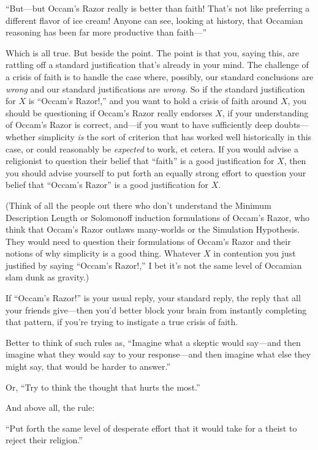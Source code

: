 {
 ``But---but Occam's Razor really
is better than faith! That's not like preferring a
different flavor of ice cream! Anyone can see, looking at history, that
Occamian reasoning has been far more productive than
faith---''}

{
 Which is all true. But beside the point. The point is that you,
saying this, are rattling off a standard justification
that's already in your mind. The challenge of a crisis
of faith is to handle the case where, possibly, our standard
conclusions are \textit{wrong} and our standard justifications are
\textit{wrong.} So if the standard justification for $X$ is
``Occam's Razor!,''
and you want to hold a crisis of faith around $X$, you should be
questioning if Occam's Razor really endorses $X$, if your
understanding of Occam's Razor is correct, and---if you
want to have sufficiently deep doubts---whether simplicity \textit{is}
the sort of criterion that has worked well historically in this case,
or could reasonably be \textit{expected} to work, et cetera. If you
would advise a religionist to question their belief that
``faith'' is a good justification
for $X$, then you should advise yourself to put forth an equally strong
effort to question your belief that
``Occam's Razor'' is
a good justification for $X$.}

{
 (Think of all the people out there who don't
understand the Minimum Description Length or Solomonoff induction
formulations of Occam's Razor, who think that
Occam's Razor outlaws many-worlds or the Simulation
Hypothesis. They would need to question their formulations of
Occam's Razor and their notions of why simplicity is a
good thing. Whatever $X$ in contention you just justified by saying
``Occam's Razor!,''
I bet it's not the same level of Occamian slam dunk as
gravity.)}

{
 If ``Occam's
Razor!'' is your usual reply, your standard reply,
the reply that all your friends give---then you'd
better block your brain from instantly completing that pattern, if
you're trying to instigate a true crisis of faith.}

{
 Better to think of such rules as, ``Imagine what
a skeptic would say---and then imagine what they would say to your
response---and then imagine what else they might say, that would be
harder to answer.''}

{
 Or, ``Try to think the thought that hurts the
most.''}

{
 And above all, the rule:}

{
 ``Put forth the same level of desperate effort
that it would take for a theist to reject their
religion.''}


